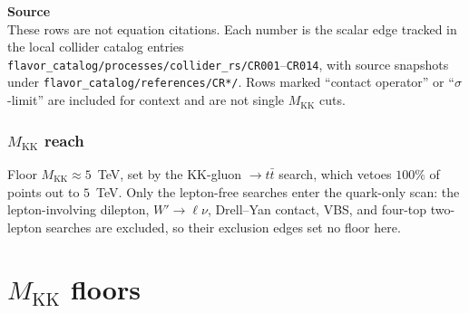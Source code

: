 \documentclass[11pt]{article}
\newcommand{\MKK}{M_{\mathrm{KK}}}
\newenvironment{srcbox}{\begin{srcboxframe}\small\raggedright\sloppy}{\end{srcboxframe}}
\begin{document}
\begin{srcbox}
\textbf{Source}\\[2pt]
These rows are not equation citations. Each number is the scalar edge tracked
in the local collider catalog entries
\texttt{flavor\_catalog/processes/collider\_rs/CR001}--\texttt{CR014}, with
source snapshots under \texttt{flavor\_catalog/references/CR*/}. Rows marked
``contact operator'' or ``$\sigma$-limit'' are included for context and are not
single $\MKK$ cuts.
\end{srcbox}

\subsubsection*{$\MKK$ reach}
\noindent Floor $\MKK\approx5$~TeV, set by the KK-gluon
$\to t\bar t$ search, which vetoes $100\%$ of points out to $5$~TeV. Only the lepton-free searches enter the quark-only
scan: the lepton-involving dilepton, $W'\to\ell\nu$, Drell--Yan contact, VBS, and
four-top two-lepton searches are excluded, so their exclusion edges set no floor
here. 

\bigskip
\section*{$\MKK$ floors}
\end{document}
